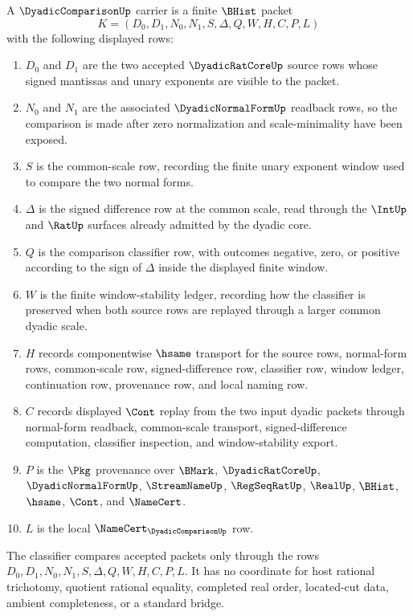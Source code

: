 \begin{definition}
\label{def:dyadic-comparison-carrier}
A $\DyadicComparisonUp$ carrier is a finite $\BHist$ packet
$$
K=(D_0,D_1,N_0,N_1,S,\Delta,Q,W,H,C,P,L)
$$
with the following displayed rows:
\begin{enumerate}
\item $D_0$ and $D_1$ are the two accepted $\DyadicRatCoreUp$ source rows whose signed mantissas and unary exponents are visible to the packet.
\item $N_0$ and $N_1$ are the associated $\DyadicNormalFormUp$ readback rows, so the comparison is made after zero normalization and scale-minimality have been exposed.
\item $S$ is the common-scale row, recording the finite unary exponent window used to compare the two normal forms.
\item $\Delta$ is the signed difference row at the common scale, read through the $\IntUp$ and $\RatUp$ surfaces already admitted by the dyadic core.
\item $Q$ is the comparison classifier row, with outcomes negative, zero, or positive according to the sign of $\Delta$ inside the displayed finite window.
\item $W$ is the finite window-stability ledger, recording how the classifier is preserved when both source rows are replayed through a larger common dyadic scale.
\item $H$ records componentwise $\hsame$ transport for the source rows, normal-form rows, common-scale row, signed-difference row, classifier row, window ledger, continuation row, provenance row, and local naming row.
\item $C$ records displayed $\Cont$ replay from the two input dyadic packets through normal-form readback, common-scale transport, signed-difference computation, classifier inspection, and window-stability export.
\item $P$ is the $\Pkg$ provenance over $\BMark$, $\DyadicRatCoreUp$, $\DyadicNormalFormUp$, $\StreamNameUp$, $\RegSeqRatUp$, $\RealUp$, $\BHist$, $\hsame$, $\Cont$, and $\NameCert$.
\item $L$ is the local $\NameCert_{\DyadicComparisonUp}$ row.
\end{enumerate}
The classifier compares accepted packets only through the rows $D_0,D_1,N_0,N_1,S,\Delta,Q,W,H,C,P,L$. It has no coordinate for host rational trichotomy, quotient rational equality, completed real order, located-cut data, ambient completeness, or a standard bridge.
\end{definition}

